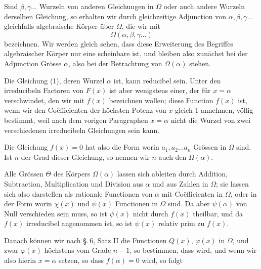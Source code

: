 
Sind $\beta, \gamma \ldots$ Wurzeln von anderen Gleichungen in $\Omega$ oder auch andere Wurzeln derselben Gleichung, so erhalten wir durch gleichzeitige Adjunction von $\alpha, \beta, \gamma \ldots$ gleichfalls algebraische Körper über $\Omega$, die wir mit
\[ \Omega(\alpha, \beta, \gamma \ldots) \]
bezeichnen. Wir werden gleich sehen, dass diese Erweiterung des Begriffes algebraischer Körper nur eine scheinbare ist, und bleiben also zunächst bei der Adjunction  Grösse $\alpha$, also bei der Betrachtung von $\Omega(\alpha)$ stehen.

Die Gleichung (1), deren Wurzel $\alpha$ ist, kann reducibel sein. Unter den irreducibeln Factoren von $F(x)$ ist aber wenigstens einer, der für $x = \alpha$ verschwindet, den wir mit $f(x)$ bezeichnen wollen; diese Function $f(x)$ ist, wenn wir den Co\"efficienten der höchsten Potenz von $x$ gleich 1 annehmen, völlig bestimmt, weil nach dem vorigen Paragraphen $x = \alpha$ nicht die Wurzel von zwei verschiedenen irreducibeln Gleichungen sein kann.

Die Gleichung $f(x) = 0$ hat also die Form
worin $a_1, a_2 \ldots a_n$ Grössen in $\Omega$ sind. Ist $n$ der Grad dieser Gleichung, so nennen wir $n$ auch den  $\Omega(\alpha)$.

Alle Grössen $\Theta$ des Körpers $\Omega(\alpha)$ lassen sich ableiten durch Addition, Subtraction, Multiplication und Division aus $\alpha$ und aus Zahlen in $\Omega$; sie lassen sich also darstellen als rationale Functionen von $\alpha$ mit Co\"efficienten in $\Omega$, oder in der Form
worin $\chi(x)$ und $\psi(x)$ Functionen in $\Omega$ sind. Da aber $\psi(\alpha)$ von Null verschieden sein muss, so ist $\psi(x)$ nicht durch $f(x)$ theilbar, und da $f(x)$ irreducibel angenommen ist, so ist $\psi(x)$ relativ prim zu $f(x)$.

Danach können wir nach \S.\,6, Satz II die Functionen $Q(x)$, $\varphi(x)$ in $\Omega$, und zwar $\varphi(x)$ höchstens vom Grade $n - 1$, so bestimmen, dass
wird, und wenn wir also hierin $x = \alpha$ setzen, so dass $f(\alpha) = 0$ wird, so folgt
